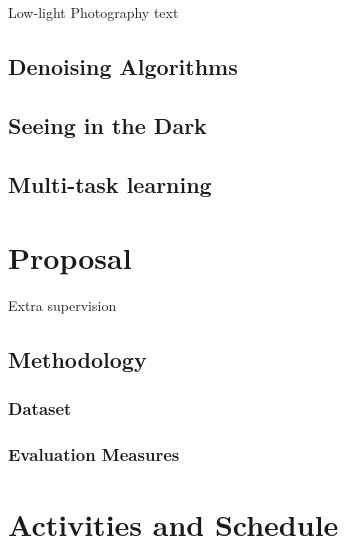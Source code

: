 Low-light Photography text

\section{Denoising Algorithms}

\section{Seeing in the Dark}

\section{Multi-task learning}


\chapter{\label{chap:proposal}Proposal}

Extra supervision

\section{Methodology}

\subsection{Dataset}

\subsection{Evaluation Measures}


\chapter{\label{chap:activ_sched}Activities and Schedule}
